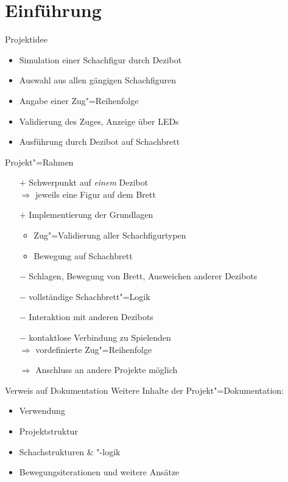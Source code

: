 
\section{Einführung}

\begin{frame}{Projektidee}
    \begin{itemize}
        \item Simulation einer Schachfigur durch Dezibot
        \item Auswahl aus allen gängigen Schachfiguren
        \item Angabe einer Zug"=Reihenfolge
        \item Validierung des Zuges, Anzeige über LEDs
        \item Ausführung durch Dezibot auf Schachbrett
    \end{itemize}
\end{frame}


\begin{frame}{Projekt"=Rahmen}
    \begin{itemize}
        \item[$+$] Schwerpunkt auf \emph{einem} Dezibot\\
            $\Rightarrow$ jeweils eine Figur auf dem Brett\\
        
        \item[$+$] Implementierung der Grundlagen\\
        \begin{itemize}
            \item Zug"=Validierung aller Schachfigurtypen
            \item Bewegung auf Schachbrett
        \end{itemize}
    \end{itemize}

    \pause
    \begin{itemize}
        \item[$-$] Schlagen, Bewegung von Brett, Ausweichen anderer Dezibots
        \item[$-$] vollständige Schachbrett"=Logik
        \item[$-$] Interaktion mit anderen Dezibots

        \item[$-$] kontaktlose Verbindung zu Spielenden\\
            $\Rightarrow$ vordefinierte Zug"=Reihenfolge

        \item[$\Rightarrow$] Anschluss an andere Projekte möglich
    \end{itemize}
\end{frame}


\begin{frame}{Verweis auf Dokumentation}
    Weitere Inhalte der Projekt"=Dokumentation:

    \begin{itemize}
        \item Verwendung
        \item Projektstruktur
        \item Schachstrukturen \& "-logik
        \item Bewegungsiterationen und weitere Ansätze
    \end{itemize}
\end{frame}
